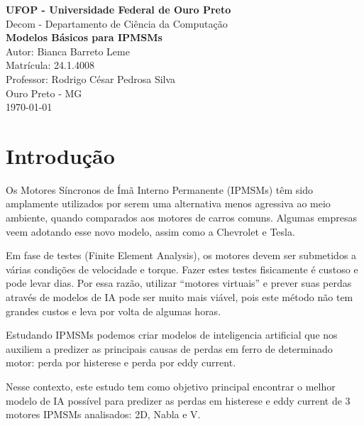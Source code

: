 \documentclass{article}
\begin{document}
\begin{titlepage}
    \centering
    \vspace*{3cm}
    {\Large\textbf{UFOP - Universidade Federal de Ouro Preto}} \\ 
    [0.3cm]
    {\large Decom - Departamento de Ciência da Computação} \\ 
    [3cm]
    {\huge\bfseries Modelos Básicos para IPMSMs} \\ 
    [1.5cm]
    {\large Autor: Bianca Barreto Leme} \\ 
    [0.5cm]
    {\large Matrícula: 24.1.4008} \\ 
    [0.5cm]
    {\large Professor: Rodrigo César Pedrosa Silva} \\ 
    [4cm]
    {\large Ouro Preto - MG} \\
    {\large \today}
\end{titlepage}

\tableofcontents
\newpage

\section{Introdução}


Os Motores Síncronos de Ímã Interno Permanente (IPMSMs) têm sido amplamente utilizados por serem uma alternativa menos agressiva ao meio ambiente, quando comparados aos motores de carros comuns. Algumas empresas veem adotando esse novo modelo, assim como a Chevrolet e Tesla.

Em fase de testes (Finite Element Analysis), os motores devem ser submetidos a várias condições de velocidade e torque. Fazer estes testes fisicamente é custoso e pode levar dias. Por essa razão, utilizar ``motores virtuais'' e prever suas perdas através de modelos de IA pode ser muito mais viável, pois este método não tem grandes custos e leva por volta de algumas horas.

Estudando IPMSMs podemos criar modelos de inteligencia artificial que nos auxiliem a predizer as principais causas de perdas em ferro de determinado motor: perda por histerese e perda por eddy current.

Nesse contexto, este estudo tem como objetivo principal encontrar o melhor modelo de IA possível para predizer as perdas em histerese e eddy current de 3 motores IPMSMs analisados: 2D, Nabla e V.
\end{document}
